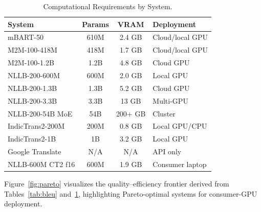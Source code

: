 \documentclass[conference]{IEEEtran}
\begin{document}
\begin{table}[t]
  \centering
  \caption{Computational Requirements by System.}
  \label{tab:compute}
  \small
  \setlength{\tabcolsep}{3pt}
  \begin{tabular}{p{3.0cm} c c p{1.8cm}}
    \toprule
    \textbf{System} & \textbf{Params} & \textbf{VRAM} & \textbf{Deployment} \\
    \midrule
    mBART-50         & 610M  & 2.4 GB & Cloud/local GPU \\
    M2M-100-418M     & 418M  & 1.7 GB & Cloud/local GPU \\
    M2M-100-1.2B     & 1.2B  & 4.8 GB & Cloud GPU       \\
    NLLB-200-600M    & 600M  & 2.0 GB & Local GPU       \\
    NLLB-200-1.3B    & 1.3B  & 5.2 GB & Cloud GPU       \\
    NLLB-200-3.3B    & 3.3B  & 13 GB  & Multi-GPU       \\
    NLLB-200-54B MoE & 54B   & 200+ GB& Cluster         \\
    IndicTrans2-200M & 200M  & 0.8 GB & Local GPU/CPU   \\
    IndicTrans2-1B   & 1B    & 3.2 GB & Local GPU       \\
    Google Translate & N/A   & N/A    & API only        \\
    NLLB-600M CT2 f16& 600M  & 1.9 GB & Consumer laptop \\
    \bottomrule
  \end{tabular}
\end{table}

Figure~\ref{fig:pareto} visualizes the quality--efficiency frontier derived
from Tables~\ref{tab:bleu} and~\ref{tab:compute}, highlighting Pareto-optimal
systems for consumer-GPU deployment.
\end{document}
